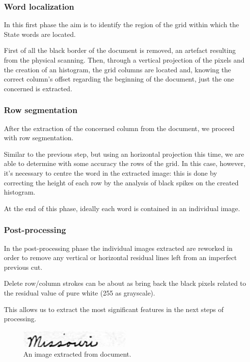 \subsubsection{Word localization}

In this first phase the aim is to identify the region of the grid within which the State words are located. 

First of all the black border of the document is removed, an artefact resulting from the physical scanning. Then, through a vertical projection of the pixels and the creation of an histogram, the grid columns are located and, knowing the correct column's offset regarding the beginning of the document, just the one concerned is extracted.

\subsubsection{Row segmentation}

After the extraction of the concerned column from the document, we proceed with row segmentation.

Similar to the previous step, but using an horizontal projection this time, we are able to determine with some accuracy the rows of the grid. In this case, however, it's necessary to centre the word in the extracted image: this is done by correcting the height of each row by the analysis of black spikes on the created histogram.

At the end of this phase, ideally each word is contained in an individual image.

\subsubsection{Post-processing}

In the post-processing phase the individual images extracted are reworked in order to remove any  vertical or horizontal residual lines left from an imperfect previous cut.

Delete row/column strokes can be about as bring back the black pixels related to the residual value of pure white (255 as grayscale).

This allows us to extract the most significant features in the next steps of processing.

\begin{figure}[!ht]
\centering
\vspace{0.3cm}
\includegraphics[width=0.5\textwidth]{images/missouri.jpg}
\caption{An image extracted from document.}
\label{fig:extracted_image}
\end{figure}

